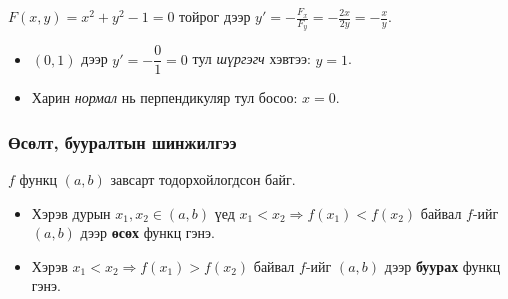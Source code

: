 \begin{example}
$F(x,y)=x^2+y^2-1=0$ тойрог дээр $\displaystyle y'=-\frac{F_x}{F_y}=-\frac{2x}{2y}=-\frac{x}{y}$.
\begin{itemize}
  \item $(0,1)$ дээр $y'=-\dfrac{0}{1}=0$ тул \emph{шүргэгч} хэвтээ: \;\; $\boxed{y=1}$.
  \item Харин \emph{нормал} нь перпендикуляр тул босоо: \;\; $\boxed{x=0}$.
\end{itemize}

\medskip
\begin{center}
\end{center}
\end{example}
\subsubsection{Өсөлт, бууралтын шинжилгээ}
\begin{definition}
$f$ функц $(a,b)$ завсарт тодорхойлогдсон байг. 
\begin{itemize}
  \item Хэрэв дурын $x_1,x_2\in(a,b)$ үед $x_1<x_2\Rightarrow f(x_1)<f(x_2)$ байвал $f$-ийг $(a,b)$ дээр \textbf{өсөх}  функц гэнэ.
  \item Хэрэв $x_1<x_2\Rightarrow f(x_1)>f(x_2)$ байвал $f$-ийг $(a,b)$ дээр \textbf{буурах} функц гэнэ.
\end{itemize}
\end{definition}

